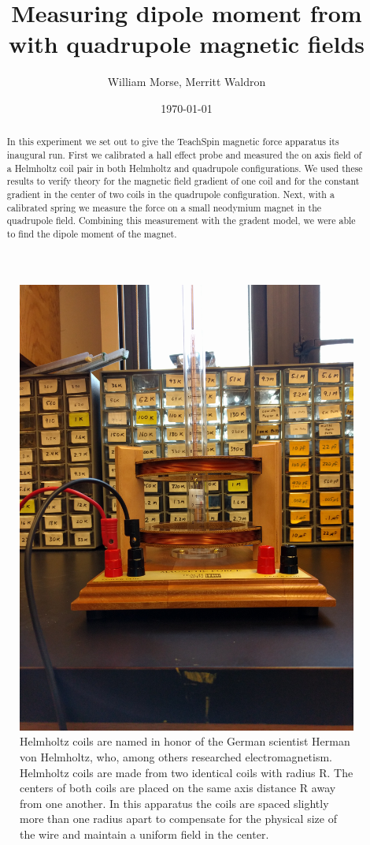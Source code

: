 \documentclass[aps,twocolumn,secnumarabic,balancelastpage,amsmath,amssymb,nofootinbib,floatfix]{revtex4-1}
\begin{document}
\title{Measuring dipole moment from with quadrupole magnetic fields}
\author{William Morse, Merritt Waldron}
\date{\today}

\begin{abstract} 
In this experiment we set out to give the TeachSpin magnetic force apparatus its inaugural run. First we calibrated a hall effect probe and measured the on axis field of a Helmholtz coil pair in both Helmholtz and quadrupole configurations. We used these results to verify theory for the magnetic field gradient of one coil and for the constant gradient in the center of two coils in the quadrupole configuration. Next, with a calibrated spring we measure the force on a small neodymium magnet in the quadrupole field. Combining this measurement with the gradent model, we were able to find the dipole moment of the magnet. 
\end{abstract}


\maketitle

\begin{figure}[here]
\includegraphics[width=.47\textwidth]{apparatus}
\caption{Helmholtz coils are named in honor of the German scientist Herman von Helmholtz, who, among others researched electromagnetism. Helmholtz coils are made from two identical coils with radius R. The centers of both coils are placed on the same axis distance R away from one another. In this apparatus the coils are spaced slightly more than one radius apart to compensate for the physical size of the wire and maintain a uniform field in the center.}
\label{apparatus}
\end{figure}
\end{document}
